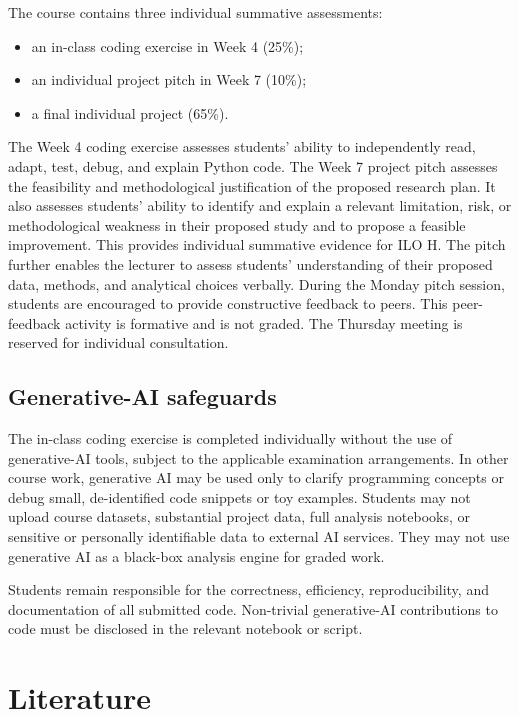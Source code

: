 \documentclass[a4paper,12pt]{report}
\begin{document}
The course contains three individual summative assessments:
\begin{itemize}
    \item an in-class coding exercise in Week 4 (25\%);
    \item an individual project pitch in Week 7 (10\%);
    \item a final individual project (65\%).
\end{itemize}

The Week 4 coding exercise assesses students' ability to independently read, adapt, test, debug, and explain Python code. The Week 7 project pitch assesses the feasibility and methodological justification of the proposed research plan. It also assesses students' ability to identify and explain a relevant limitation, risk, or methodological weakness in their proposed study and to propose a feasible improvement. This provides individual summative evidence for ILO H. The pitch further enables the lecturer to assess students' understanding of their proposed data, methods, and analytical choices verbally. During the Monday pitch session, students are encouraged to provide constructive feedback to peers. This peer-feedback activity is formative and is not graded. The Thursday meeting is reserved for individual consultation.

\section*{Generative-AI safeguards}

The in-class coding exercise is completed individually without the use of generative-AI tools, subject to the applicable examination arrangements. In other course work, generative AI may be used only to clarify programming concepts or debug small, de-identified code snippets or toy examples. Students may not upload course datasets, substantial project data, full analysis notebooks, or sensitive or personally identifiable data to external AI services. They may not use generative AI as a black-box analysis engine for graded work.

Students remain responsible for the correctness, efficiency, reproducibility, and documentation of all submitted code. Non-trivial generative-AI contributions to code must be disclosed in the relevant notebook or script.

\chapter{Literature}

\end{document}
